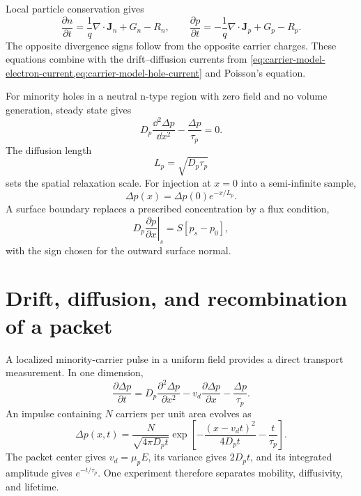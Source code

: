 Local particle conservation gives
\begin{equation}
  \frac{\partial n}{\partial t}
  =\frac1q\nabla\cdot\bm J_n+G_n-R_n,
  \qquad
  \frac{\partial p}{\partial t}
  =-\frac1q\nabla\cdot\bm J_p+G_p-R_p.
  \label{eq:nonequilibrium-continuity-pair}
\end{equation}
The opposite divergence signs follow from the opposite carrier charges.  These
equations combine with the drift--diffusion currents from
\cref{eq:carrier-model-electron-current,eq:carrier-model-hole-current} and
Poisson's equation.

For minority holes in a neutral n-type region with zero field and no volume
generation, steady state gives
\begin{equation}
  D_p\frac{\dd^2\Delta p}{\dd x^2}
  -\frac{\Delta p}{\tau_p}=0.
  \label{eq:minority-hole-diffusion-equation}
\end{equation}
The diffusion length
\begin{equation}
  \boxed{L_p=\sqrt{D_p\tau_p}}
  \label{eq:hole-diffusion-length}
\end{equation}
sets the spatial relaxation scale.  For injection at $x=0$ into a semi-infinite
sample,
\begin{equation}
  \Delta p(x)=\Delta p(0)e^{-x/L_p}.
  \label{eq:semi-infinite-minority-profile}
\end{equation}
A surface boundary replaces a prescribed concentration by a flux condition,
\begin{equation}
  D_p\left.\frac{\partial p}{\partial x}\right|_s
  =S[p_s-p_0],
  \label{eq:surface-recombination-boundary}
\end{equation}
with the sign chosen for the outward surface normal.

\section{Drift, diffusion, and recombination of a packet}

A localized minority-carrier pulse in a uniform field provides a direct
transport measurement.  In one dimension,
\begin{equation}
  \frac{\partial\Delta p}{\partial t}
  =D_p\frac{\partial^2\Delta p}{\partial x^2}
  -v_d\frac{\partial\Delta p}{\partial x}
  -\frac{\Delta p}{\tau_p}.
  \label{eq:haynes-shockley-equation}
\end{equation}
An impulse containing $N$ carriers per unit area evolves as
\begin{equation}
  \Delta p(x,t)
  =\frac{N}{\sqrt{4\pi D_pt}}
   \exp\left[-\frac{(x-v_dt)^2}{4D_pt}-\frac{t}{\tau_p}\right].
  \label{eq:haynes-shockley-solution}
\end{equation}
The packet center gives $v_d=\mu_pE$, its variance gives $2D_pt$, and its
integrated amplitude gives $e^{-t/\tau_p}$.  One experiment therefore separates
mobility, diffusivity, and lifetime.

